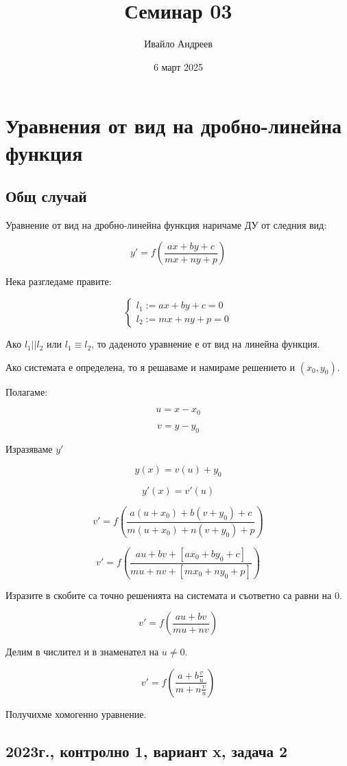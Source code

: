 \documentclass{scrartcl}
\title{Семинар 03}
\author{Ивайло Андреев}
\date{6 март 2025}
\begin{document}
\maketitle  %

\section{Уравнения от вид на дробно-линейна функция}

\subsection{Общ случай}

Уравнение от вид на дробно-линейна функция наричаме ДУ от следния вид:

$$y' = f\left(\dfrac{ax+by+c}{mx+ny+p}\right)$$

Нека разгледаме правите:

$$
\begin{cases}
l_1 := ax+by+c = 0 \\
l_2 := mx+ny+p = 0
\end{cases}
$$

Ако $l_1 || l_2$ или $l_1 \equiv l_2$, то даденото уравнение е от вид на линейна функция.

Ако системата е определена, то я решаваме и намираме решението и $(x_0, y_0)$.

Полагаме:

$$u = x - x_0$$

$$v = y - y_0$$

Изразяваме $y'$

$$y(x) = v(u) + y_0$$

$$y'(x) = v'(u)$$

$$v' = f\left(\dfrac{a(u+x_0) + b(v+y_0) + c}{m(u+x_0) + n(v+y_0) + p}\right)$$

$$v' = f\left(\dfrac{au + bv + [ax_0 + by_0 + c]}{mu + nv + [mx_0 + ny_0 + p]}\right)$$

Изразите в скобите са точно решенията на системата и съответно са равни на $0$.

$$v' = f\left(\dfrac{au + bv}{mu + nv}\right)$$

Делим в числител и в знаменател на $u \ne 0$.

$$v' = f\left(\dfrac{a + b\frac{v}{u}}{m + n\frac{v}{u}}\right)$$

Получихме хомогенно уравнение.

\subsection{2023г., контролно 1, вариант x, задача 2}
\end{document}
